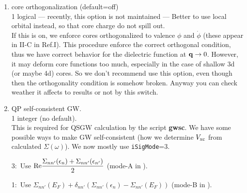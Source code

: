 \documentclass[a4paper,10pt,epsf,fleqn]{article}
\newcommand{\keyw}[1]{\fbox{\tt #1}}
\newcommand{\ds}{\displaystyle}
\newcommand{\exe}[1]{{\bf #1}\index{#1}}
\begin{document}
{\begin{enumerate}


\item core orthogonalization (default=off)\\
\keyw{CoreOrth} 1 logical --- recently, this option is not maintained
--- Better to use local orbital instead, so that core charge do not spill out.\\
If this is on, we enforce cores orthogonalized to valence 
$\phi$ and $\dot{\phi}$ (these appear in II-C in Ref.I).
This procedure enforce the correct orthogonal condition, thus
we have correct behavior for the dielectric function at ${\bf q} \to 0$.
However, it may deform core functions too much, 
especially in the case of shallow 3d (or maybe 4d) cores.
So we don't recommend use this option, even though then 
the orthogonality condition is somehow broken.
Anyway you can check weather it affects to results or not by this switch.

\item QP self-consistent GW.\\
\keyw{iSigMode} 1 integer (no default).\\
This is required for QSGW calculation by the script \exe{gwsc}.
We have some possible ways to make GW self-consistent
(how we determine $V_{\rm xc}$ from calculated $\Sigma(\omega)$).
We now mostly use {\tt iSigMode}=3. 

3:\ Use $\ds {\rm Re}\frac{\Sigma_{nn'}(\epsilon_n)+\Sigma_{nn'}(\epsilon_{n'})}{2}$
  (mode-A in \cite{xxx}).

1:\ Use $\ds \Sigma_{nn'}(E_F) + \delta_{nn'}(\Sigma_{nn'}(\epsilon_n)-\Sigma_{nn'}(E_F))$
   (mode-B in \cite{xxx}).


\end{enumerate}}
\end{document}
